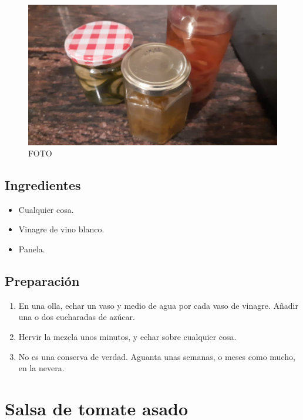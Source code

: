\documentclass[
]{book}
\providecommand{\tightlist}{%
  \setlength{\itemsep}{0pt}\setlength{\parskip}{0pt}}
\begin{document}
\begin{figure}
\centering
\includegraphics{images/encurtidos.jpg}
\caption{FOTO}
\end{figure}

\hypertarget{ingredientes-11}{%
\section*{Ingredientes}\label{ingredientes-11}}

\begin{itemize}
\tightlist
\item
  Cualquier cosa.
\item
  Vinagre de vino blanco.
\item
  Panela.
\end{itemize}

\hypertarget{preparaciuxf3n-11}{%
\section*{Preparación}\label{preparaciuxf3n-11}}

\begin{enumerate}
\def\labelenumi{\arabic{enumi}.}
\tightlist
\item
  En una olla, echar un vaso y medio de agua por cada vaso de vinagre. Añadir una o dos cucharadas de azúcar.
\item
  Hervir la mezcla unos minutos, y echar sobre cualquier cosa.
\item
  No es una conserva de verdad. Aguanta unas semanas, o meses como mucho, en la nevera.
\end{enumerate}

\hypertarget{salsa-de-tomate-asado}{%
\chapter{Salsa de tomate asado}\label{salsa-de-tomate-asado}}
\end{document}
